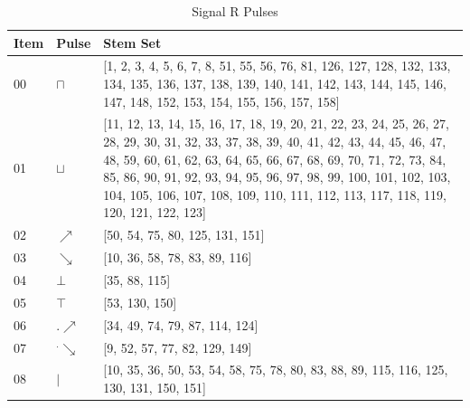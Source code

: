 \documentclass[10pt,journal]{IEEEtran}
\begin{document}
\begin{table}[H] \caption{Signal R Pulses}\centering\begin{tabular}{|p{.4cm}|p{.5cm}|p{6.5cm}|}\hline Item&Pulse &Stem Set\\ \hline 00& \footnotesize$\sqcap$ & \footnotesize[1, 2, 3, 4, 5, 6, 7, 8, 51, 55, 56, 76, 81, 126, 127, 128, 132, 133, 134, 135, 136, 137, 138, 139, 140, 141, 142, 143, 144, 145, 146, 147, 148, 152, 153, 154, 155, 156, 157, 158]\\ \hline 01& \footnotesize$\sqcup$ & \footnotesize[11, 12, 13, 14, 15, 16, 17, 18, 19, 20, 21, 22, 23, 24, 25, 26, 27, 28, 29, 30, 31, 32, 33, 37, 38, 39, 40, 41, 42, 43, 44, 45, 46, 47, 48, 59, 60, 61, 62, 63, 64, 65, 66, 67, 68, 69, 70, 71, 72, 73, 84, 85, 86, 90, 91, 92, 93, 94, 95, 96, 97, 98, 99, 100, 101, 102, 103, 104, 105, 106, 107, 108, 109, 110, 111, 112, 113, 117, 118, 119, 120, 121, 122, 123]\\ \hline 02& \footnotesize$\nearrow$ & \footnotesize[50, 54, 75, 80, 125, 131, 151]\\ \hline 03& \footnotesize$\searrow$ & \footnotesize[10, 36, 58, 78, 83, 89, 116]\\ \hline 04& \footnotesize$\bot$ & \footnotesize[35, 88, 115]\\ \hline 05& \footnotesize$\top$ & \footnotesize[53, 130, 150]\\ \hline 06& \footnotesize$.\nearrow$ & \footnotesize[34, 49, 74, 79, 87, 114, 124]\\ \hline 07& \footnotesize$^.\searrow$ & \footnotesize[9, 52, 57, 77, 82, 129, 149]\\ \hline 08& \footnotesize$|$ & \footnotesize[10, 35, 36, 50, 53, 54, 58, 75, 78, 80, 83, 88, 89, 115, 116, 125, 130, 131, 150, 151]\\ \hline \end{tabular} \end{table} 
\end{document}
